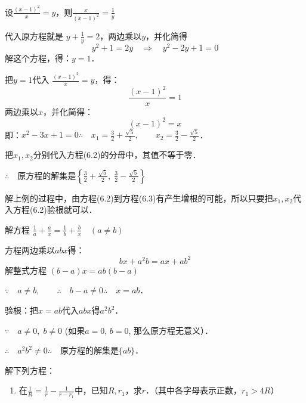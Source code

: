 \begin{solution}
设$\frac{(x-1)^2}{x}=y$，则$\frac{x}{(x-1)^2}=\frac{1}{y}$

代入原方程就是 $y+\frac{1}{y}=2$，两边乘以$y$，并化简得
\[y^2+1=2y\quad \Rightarrow\quad y^2-2y+1=0\]
解这个方程，得：$y=1$．

把$y=1$代入 $\frac{(x-1)^2}{x}=y$，得：
\begin{equation}
    \frac{(x-1)^2}{x}=1
\end{equation}
两边乘以$x$，并化简得：
\begin{equation}
    (x-1)^2=x
\end{equation}
即：$x^2-3x+1=0$$\therefore\quad x_1=\frac{3}{2}+\frac{\sqrt{5}}{2},\qquad x_2=\frac{3}{2}-\frac{\sqrt{5}}{2}$．

把$x_1,x_2$分别代入方程(6.2)的分母中，其值不等于零．

$\therefore\quad $原方程的解集是$\left\{\frac{3}{2}+\frac{\sqrt{5}}{2},\; \frac{3}{2}-\frac{\sqrt{5}}{2}\right\}$

\end{solution}

\begin{note}
   解上例的过程中，由方程(6.2)到方程(6.3)有产生增根的可能，所以只要把$x_1,x_2$代入方程(6.2)验根就可以．
\end{note}



\begin{example}
    解方程
$\frac{1}{a}+\frac{a}{x}=\frac{1}{b}+\frac{b}{x}\quad (a\ne b)$
\end{example}

\begin{solution}
    方程两边乘以$abx$得：
\[bx+a^2b=ax+ab^2\]
解整式方程 $(b-a)x=ab(b-a)$

$\because\quad a\ne b,\qquad \therefore\quad b-a\ne 0$\qquad$\therefore\quad x=ab$．

验根：把$x=ab$代入$abx$得$a^2b^2$．

$\because\quad a\ne 0,\; b\ne 0$ (如果$a=0$, $b=0$, 那么原方程无意义）．

$\therefore\quad a^2b^2\ne 0$\qquad$\therefore\quad $原方程的解集是$\{ab\}$．
\end{solution}

\begin{ex}
    解下列方程：
\begin{enumerate}
    \item 在$\frac{1}{R}=\frac{1}{r}-\frac{1}{r-r_1}$中，已知$R,r_1$，求$r$．（其中各字母表示正数，$r_1>4R$）
\end{enumerate}
\end{ex}

